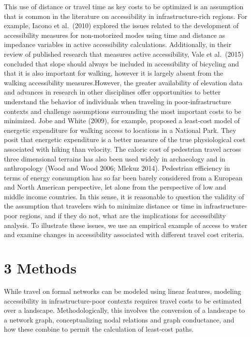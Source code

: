 \documentclass[]{elsarticle} %
\begin{document}
This use of distance or travel time as key costs to be optimized is an
assumption that is common in the literature on accessibility in
infrastructure-rich regions. For example, Iacono et al.~(2010) explored
the issues related to the development of accessibility measures for
non-motorized modes using time and distance as impedance variables in
active accessibility calculations. Additionally, in their review of
published research that measures active accessibility, Vale et
al.~(2015) concluded that slope should always be included in
accessibility of bicycling and that it is also important for walking,
however it is largely absent from the walking accessibility
measures.However, the greater availability of elevation data and
advances in research in other disciplines offer opportunities to better
understand the behavior of individuals when traveling in
poor-infrastructure contexts and challenge assumptions surrounding the
most important costs to be minimized. Jobe and White (2009), for
example, proposed a least-cost model of energetic expenditure for
walking access to locations in a National Park. They posit that
energetic expenditure is a better measure of the true physiological cost
associated with hiking than velocity. The caloric cost of pedestrian
travel across three dimensional terrains has also been used widely in
archaeology and in anthropology (Wood and Wood 2006; Mlekuz 2014).
Pedestrian efficiency in terms of energy consumption has so far been
barely considered from a European and North American perspective, let
alone from the perspective of low and middle income countries. In this
sense, it is reasonable to question the validity of the assumption that
travelers wish to minimize distance or time in infrastructure-poor
regions, and if they do not, what are the implications for accessibility
analysis. To illustrate these issues, we use an empirical example of
access to water and examine changes in accessibility associated with
different travel cost criteria.

\hypertarget{methods}{%
\section{3 Methods}\label{methods}}

While travel on formal networks can be modeled using linear features,
modeling accessibility in infrastructure-poor contexts requires travel
costs to be estimated over a landscape. Methodologically, this involves
the conversion of a landscape to a network graph, conceptualizing nodal
relations and graph conductance, and how these combine to permit the
calculation of least-cost paths.
\end{document}
